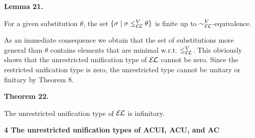 \documentclass[10pt,a4paper]{amsart}
\begin{document}
 
 
\par\medskip\noindent\textbf{Lemma 21.}\par
 
 
For a given substitution $\theta$, the set $\{\sigma\mid\sigma\leq_{\mathcal{E\mkern-1.618muL}}^{V}\theta\}$ is finite up to $\sim_{\mathcal{E\mkern-1.618muL}}^{V}$-equivalence.\par
 
 
 
 
As an immediate consequence we obtain that the set of substitutions more general than $\theta$ contains elements that are minimal w.r.t. $\leq_{\mathcal{E\mkern-1.618muL}}^{V}$. This obviously shows that the unrestricted unification type of $\mathcal{E\mkern-1.618muL}$ cannot be zero. Since the restricted unification type is zero, the unrestricted type cannot be unitary or finitary by Theorem 8.\par
 
 
 
\par\medskip\noindent\textbf{Theorem 22.}\par
 
 
The unrestricted unification type of $\mathcal{E\mkern-1.618muL}$ is infinitary.\par
 
 
 
 

 
\par\medskip\noindent\textbf{4 The unrestricted unification types of ACUI, ACU, and AC}\par
 
 
\end{document}
